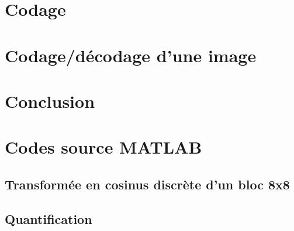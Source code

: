 \documentclass[a4paper, 12pt]{article}
\newcommand{\FSource}[1]{%

}
\begin{document}
\section{Codage}

\section{Codage/décodage d'une image}

\newpage

\section{Conclusion}



\clearpage

%
%
\appendix

\section{Codes source MATLAB}
\subsection{Transformée en cosinus discrète d'un bloc 8x8}\label{dct_code}

\FSource{../MyDCT.m}

\newpage

\subsection{Quantification}\label{quant_code}

\FSource{../QuantM.m}

\newpage
\end{document}
